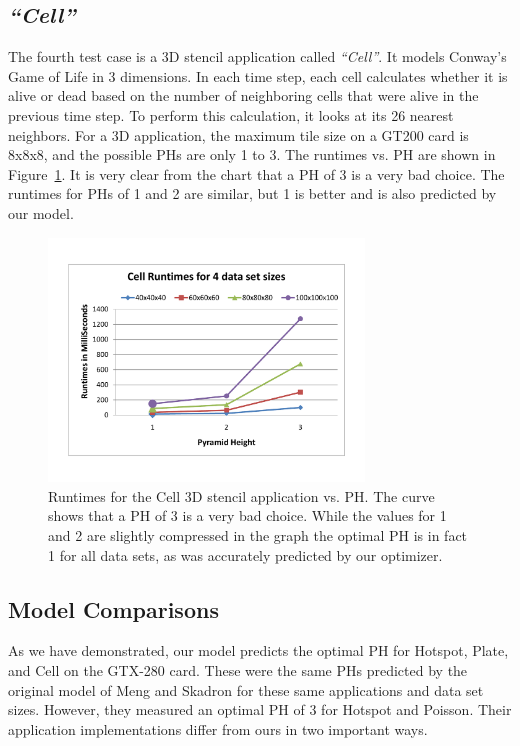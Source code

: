 \documentclass[preprint,nocopyrightspace]{styles/sigplanconf}
\begin{document}
\subsection{\em ``Cell''}
The fourth test case is a 3D stencil application called {\em ``Cell''}.  It models Conway's Game of Life in 3 dimensions.  
In each time step, each cell calculates whether it is alive or dead based on the number of neighboring cells that were alive in the previous
time step.  To perform this calculation, it looks at its 26 nearest neighbors.  
For a 3D application, the maximum tile size on a GT200 card is 8x8x8, 
and the possible PHs are only 1 to 3.  The runtimes vs. PH are shown in Figure~\ref{fig:cellTimes}.  
It is very clear from the chart that a PH of 3 is a very bad choice.  The runtimes for PHs of 1 and 2 are similar, 
but 1 is better and is also predicted by our model.
\begin{figure}
\includegraphics[clip,trim=1in 1in 1in 1in,width=3.3in]{figures/CellTimingData}
\caption{Runtimes for the Cell 3D stencil application vs. PH.
The curve shows that a PH of 3 is a very bad choice.  While the values for 1 and 2 are slightly 
compressed in the graph the optimal PH is in fact 1 for all data sets, as was accurately predicted by our optimizer.}
\label{fig:cellTimes}
\end{figure}

\subsection{Model Comparisons}
As we have demonstrated, our model predicts the optimal PH for 
Hotspot, Plate, and Cell on the GTX-280 card.
These were the same PHs predicted by the original model of Meng and Skadron 
for these same applications and data set sizes.  However, they
measured an optimal PH of 3 for Hotspot and Poisson.  
Their application implementations differ from ours in two important ways.  
\end{document}
